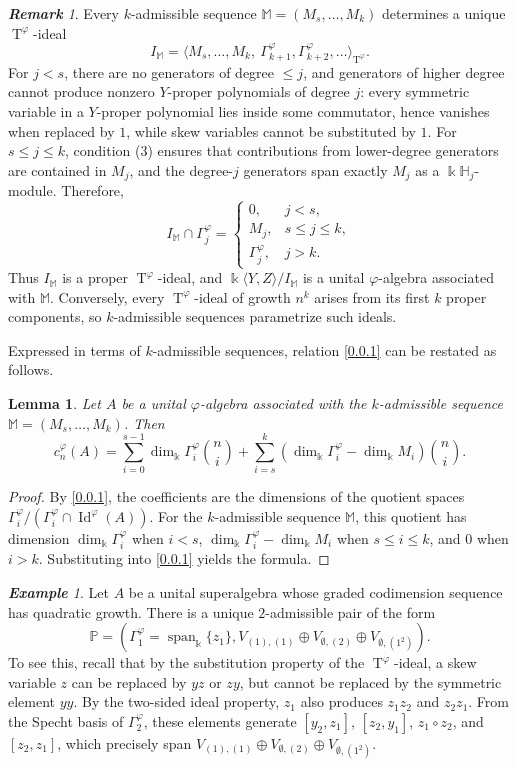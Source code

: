 \documentclass{amsart}
\newtheorem{lem}[thm]{Lemma}
\theoremstyle{definition}
\theoremstyle{remark}
\newtheorem{rmk}[thm]{\bf Remark}
\newtheorem{exm}[thm]{\bf Example}
\numberwithin{equation}{section}
\def \Ga{\Gamma}
\def \vp{\varphi}
\def \k{\Bbbk}
\def \H{\mathbb{H}}
\def \M{\mathbb{M}}
\def \P{\mathbb{P}}
\def \Id{\operatorname{Id}}
\def \sp{\operatorname{span}}
\def \T{\operatorname{T}}
\def \es{\emptyset}
\begin{document}
\begin{rmk}\label{rmk2.2}
	Every $k$-admissible sequence $\M=(M_s,\dots,M_k)$ determines a unique $\T^\vp$-ideal
	\[
	I_\M=\bigl\langle M_s,\dots,M_k,\ \Ga_{k+1}^\vp,\Ga_{k+2}^\vp,\dots \bigr\rangle_{\T^\vp}.
	\]
	For $j<s$, there are no generators of degree $\le j$, and generators of higher degree cannot produce nonzero $Y$-proper polynomials of degree $j$: every symmetric variable in a $Y$-proper polynomial lies inside some commutator, hence vanishes when replaced by $1$, while skew variables cannot be substituted by $1$. For $s\le j\le k$, condition (3) ensures that contributions from lower-degree generators are contained in $M_j$, and the degree-$j$ generators span exactly $M_j$ as a $\k\H_j$-module. Therefore,
	\[
	I_\M\cap \Ga_j^\vp=
	\begin{cases}
		0, & j<s,\\
		M_j, & s\le j\le k,\\
		\Ga_j^\vp, & j>k.
	\end{cases}
	\]
	Thus $I_\M$ is a proper $\T^\vp$-ideal, and $\k\langle Y,Z\rangle/I_\M$ is a unital $\vp$-algebra associated with $\M$. Conversely, every $\T^\vp$-ideal of growth $n^k$ arises from its first $k$ proper components, so $k$-admissible sequences parametrize such ideals.
\end{rmk}
	
	Expressed in terms of $k$-admissible sequences, relation \eqref{0.0.1} can be restated as follows.
	
\begin{lem}\label{lem2.3}
	Let $A$ be a unital $\vp$-algebra associated with the $k$-admissible sequence $\M=(M_s,\dots,M_k)$. Then
	\[
	c_n^\vp(A) = \sum_{i=0}^{s-1} \dim_\k \Ga_i^\vp \binom{n}{i}+ \sum_{i=s}^{k}(\dim_\k \Ga_i^\vp - \dim_\k M_i) \binom{n}{i}.
	\]
\end{lem}
\begin{proof}
	By \eqref{0.0.1}, the coefficients are the dimensions of the quotient spaces $\Ga_i^\vp/(\Ga_i^\vp \cap \Id^\vp(A))$. For the $k$-admissible sequence $\M$, this quotient has dimension $\dim_\k \Ga_i^\vp$ when $i<s$, $\dim_\k \Ga_i^\vp - \dim_\k M_i$ when $s\le i\le k$, and $0$ when $i>k$. Substituting into \eqref{0.0.1} yields the formula.
\end{proof}

\begin{exm}\label{exm2.4}
	Let $A$ be a unital superalgebra whose graded codimension sequence has quadratic growth. There is a unique $2$-admissible pair of the form
	\[
	\P=(\Ga_1^\vp = \sp_\k \{ z_1 \}, V_{(1),(1)} \oplus V_{\es,(2)} \oplus V_{\es,(1^2)}).
	\]
	To see this, recall that by the substitution property of the  $\T^\vp$-ideal, a skew variable $z$ can be replaced by $yz$ or $zy$, but cannot be replaced by the symmetric element $yy$. By the two-sided ideal property, $z_1$ also produces $z_1z_2$ and $z_2z_1$. From the Specht basis of $\Ga_2^\vp$, these elements generate $[y_2,z_1]$, $[z_2,y_1]$, $z_1 \circ z_2$, and $[z_2,z_1]$, which precisely span $V_{(1),(1)} \oplus V_{\es,(2)} \oplus V_{\es,(1^2)}$.
\end{exm}
	
\end{document}
